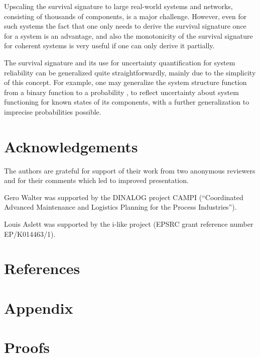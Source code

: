 \documentclass[12pt, a4paper]{elsarticle}
\begin{document}
Upscaling the survival signature to large real-world systems and networks, consisting of thousands of components, is a major challenge.
However, even for such systems the fact that one only needs to derive the survival signature once for a system is an advantage,
and also the monotonicity of the survival signature for coherent systems is very useful if one can only derive it partially.  

The survival signature and its use for uncertainty quantification for system
reliability can be generalized quite straightforwardly, mainly due to the simplicity of this concept.
For example, one may generalize the system structure function from a binary function to a probability \citep[see][]{CCM16},
to reflect uncertainty about system functioning for known states of its components, with a further
generalization to imprecise probabilities possible.

\section*{Acknowledgements}

The authors are grateful for support of their work from two anonymous reviewers and for their comments which led to improved presentation.

Gero Walter was supported by the DINALOG project CAMPI
(``Coordinated Advanced Maintenance and Logistics Planning for the Process Industries'').

Louis Aslett was supported by the i-like project (EPSRC grant reference number EP/K014463/1).


\section*{References}





\section*{Appendix}
\appendix
\renewcommand*{\thesection}{\Alph{section}}

\section{Proofs}
\label{ap:proofs}
\end{document}
